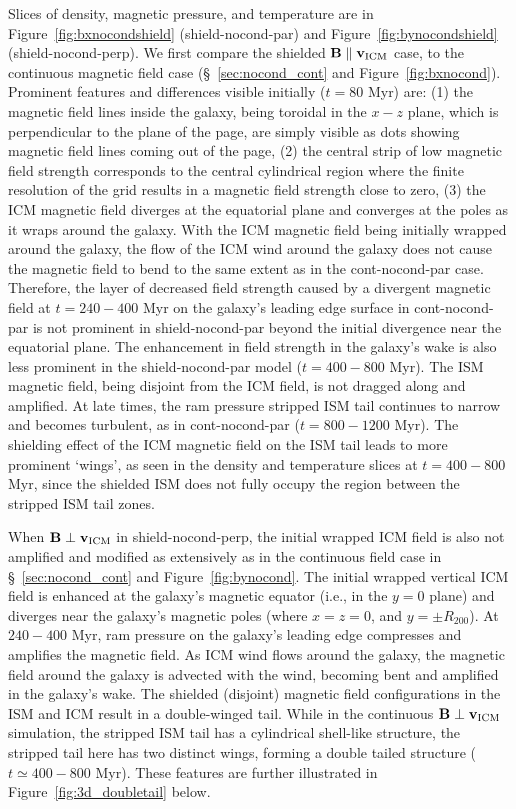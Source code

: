 \documentclass[twocolumn]{aastex6}
\begin{document}
Slices of density, magnetic pressure, and temperature are in Figure~\ref{fig:bxnocondshield} (shield-nocond-par) and Figure~\ref{fig:bynocondshield} (shield-nocond-perp). We first compare the shielded $\mathbf{B} \parallel \mathbf{v_{\rm ICM}}$ case, to the continuous magnetic field case (\S~\ref{sec:nocond_cont} and Figure~\ref{fig:bxnocond}). Prominent features and differences visible initially ($t = 80$ Myr) are: (1) the magnetic field lines inside the galaxy, being toroidal in the $x-z$ plane, which is perpendicular to the plane of the page, are simply visible as dots showing magnetic field lines coming out of the page, (2) the central strip of low magnetic field strength corresponds to the central cylindrical region where the finite resolution of the grid results in a magnetic field strength close to zero, (3) the ICM magnetic field diverges at the equatorial plane and converges at the poles as it wraps around the galaxy. With the ICM magnetic field being initially wrapped around the galaxy, the flow of the ICM wind around the galaxy does not cause the magnetic field to bend to the same extent as in the cont-nocond-par case. Therefore, the layer of decreased field strength caused by a divergent magnetic field at $t = 240 - 400$ Myr on the galaxy's leading edge surface in cont-nocond-par is not prominent in shield-nocond-par beyond the initial divergence near the equatorial plane. The enhancement in field strength in the galaxy's wake is also less prominent in the shield-nocond-par model ($t = 400 - 800$ Myr). The ISM magnetic field, being disjoint from the ICM field, is not dragged along and amplified. At late times, the ram pressure stripped ISM tail continues to narrow and becomes turbulent, as in cont-nocond-par ($t = 800 - 1200$ Myr). The shielding effect of the ICM magnetic field on the ISM tail leads to more prominent `wings', as seen in the density and temperature slices at $t = 400 - 800$ Myr, since the shielded ISM does not fully occupy the region between the stripped ISM tail zones.

When $\mathbf{B} \perp \mathbf{v_{\rm ICM}}$ in shield-nocond-perp, the initial wrapped ICM field is also not amplified and modified as extensively as in the continuous field case in \S~\ref{sec:nocond_cont} and Figure~\ref{fig:bynocond}. The initial wrapped vertical ICM field is enhanced at the galaxy's magnetic equator (i.e., in the $y = 0$ plane) and diverges near the galaxy's magnetic poles (where $x = z = 0$, and $y = \pm R_{200}$). At $240 - 400$ Myr, ram pressure on the galaxy's leading edge compresses and amplifies the magnetic field. As ICM wind flows around the galaxy, the magnetic field around the galaxy is advected with the wind, becoming bent and amplified in the galaxy's wake. The shielded (disjoint) magnetic field configurations in the ISM and ICM result in a double-winged tail. While in the continuous $\mathbf{B} \perp \mathbf{v_{\rm ICM}}$ simulation, the stripped ISM tail has a cylindrical shell-like structure, the stripped tail here has two distinct wings, forming a double tailed structure ($t \simeq 400 - 800$ Myr). These features are further illustrated in Figure~\ref{fig:3d_doubletail} below.
\end{document}
